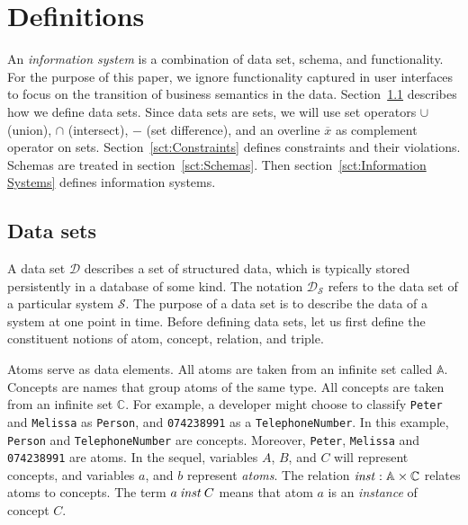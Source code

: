 \documentclass[runningheads]{llncs}
\newcommand{\id}[1]{\text{\it #1\/}}
\newcommand{\instance}{\mathbin{\id{inst}}}
\newcommand{\Pair}[2]{#1\times#2}
\newcommand{\atom}[1]{{\tt\small #1}}
\newcommand{\Atoms}{\mathbb{A}}
\newcommand{\concept}[1]{{\tt\small #1}}
\newcommand{\Concepts}{\mathbb{C}}
\newcommand{\dataset}{\mathscr{D}}
\newcommand{\infsys}{\mathscr{S}}
\newcommand{\cmpl}[1]{\overline{#1}}
\def\define#1{\label{dfn:#1}{\em #1}\index{#1}}
\begin{document}
\section{Definitions}
\label{sct:Definitions}
   An \define{information system} is a combination of data set, schema, and functionality.
   For the purpose of this paper, we ignore functionality captured in user interfaces to focus on the transition of business semantics in the data.
   Section~\ref{sct:Data sets} describes how we define data sets.
   Since data sets are sets, we will use set operators $\cup$ (union), $\cap$ (intersect), $-$ (set difference), and an overline $\cmpl{x}$ as complement operator on sets.
   Section~\ref{sct:Constraints} defines constraints and their violations.
   Schemas are treated in section~\ref{sct:Schemas}.
   Then section~\ref{sct:Information Systems} defines information systems.

\subsection{Data sets}
\label{sct:Data sets}
   A data set $\dataset$ describes a set of structured data, which is typically stored persistently in a database of some kind.
   The notation $\dataset_{\infsys}$ refers to the data set of a particular system $\infsys$.
   The purpose of a data set is to describe the data of a system at one point in time. 
   Before defining data sets, let us first define the constituent notions of atom, concept, relation, and triple.
   
   Atoms serve as data elements.
   All atoms are taken from an infinite set called $\Atoms$.
   Concepts are names that group atoms of the same type.
   All concepts are taken from an infinite set $\Concepts$.
   For example, a developer might choose to classify \atom{Peter} and \atom{Melissa} as \concept{Person},
   and \atom{074238991} as a \concept{TelephoneNumber}.
   In this example, \concept{Person} and \concept{TelephoneNumber} are concepts.
   Moreover, \atom{Peter}, \atom{Melissa} and \atom{074238991} are atoms.
   In the sequel, variables $A$, $B$, and $C$ will represent concepts, and variables $a$, and $b$ represent \emph{atoms}.
   The relation $\instance:\Pair{\Atoms}{\Concepts}$ relates atoms to concepts.
   The term $a\instance C$ means that atom $a$ is an \emph{instance} of concept $C$.
\end{document}
